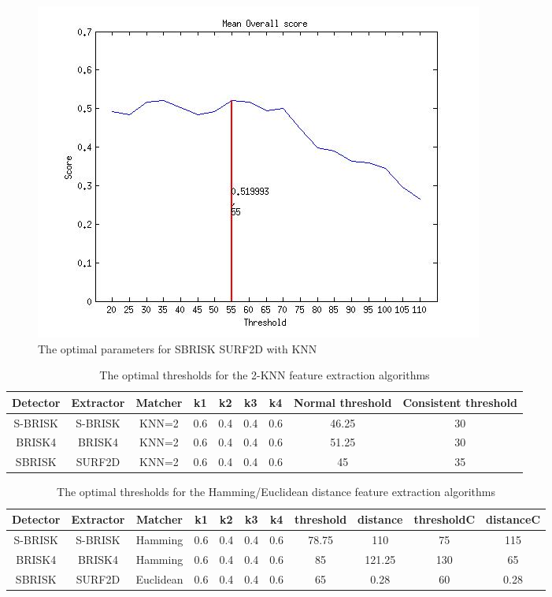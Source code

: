 \documentclass{article}
\begin{document}
\begin{figure}[h!]
\begin{minipage}[b]{0.5\linewidth}
\includegraphics[scale=0.5]{../Drawings/OptimalParameters_SBRISK_SURF2D_KNN.jpg}
\caption{The optimal parameters for SBRISK SURF2D with KNN}
\label{fig:sbriskHammingOptimal}
\end{minipage}
\end{figure}

\begin{table}
\caption{The optimal thresholds for the 2-KNN feature extraction algorithms}
\begin{tabular}{|c|c|c|c|c|c|c|c|c|}
\hline 
Detector & Extractor & Matcher & k1 & k2 & k3 & k4 & Normal threshold & Consistent threshold\tabularnewline
\hline 
\hline 
S-BRISK & S-BRISK & KNN=2 & 0.6 & 0.4 & 0.4 & 0.6 & 46.25 & 30\tabularnewline
\hline 
BRISK4 & BRISK4 & KNN=2 & 0.6 & 0.4 & 0.4 & 0.6 & 51.25 & 30\tabularnewline
\hline 
SBRISK & SURF2D & KNN=2 & 0.6 & 0.4 & 0.4 & 0.6 & 45 & 35\tabularnewline
\hline 
\end{tabular}
\label{tab:knnStatistics}
\end{table}

\begin{table}
\caption{The optimal thresholds for the Hamming/Euclidean distance feature extraction algorithms}
\begin{tabular}{|c|c|c|c|c|c|c|c|c|c|c|}
\hline 
Detector & Extractor & Matcher & k1 & k2 & k3 & k4 & threshold & distance & thresholdC & distanceC\tabularnewline
\hline 
\hline 
S-BRISK & S-BRISK & Hamming & 0.6 & 0.4 & 0.4 & 0.6 & 78.75 & 110 & 75 & 115\tabularnewline
\hline 
BRISK4 & BRISK4 & Hamming & 0.6 & 0.4 & 0.4 & 0.6 & 85 & 121.25 & 130 & 65\tabularnewline
\hline 
SBRISK & SURF2D & Euclidean & 0.6 & 0.4 & 0.4 & 0.6 & 65 & 0.28 & 60 & 0.28\tabularnewline
\hline 
\end{tabular}
\label{tab:hammingStatistics}
\end{table}
\end{document}
